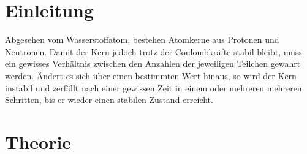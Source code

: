 
	\section{Einleitung}				%
Abgesehen vom Wasserstoffatom, bestehen Atomkerne aus Protonen und Neutronen. Damit der Kern jedoch trotz der Coulombkräfte stabil bleibt, muss ein gewisses Verhältnis zwischen den Anzahlen der jeweiligen Teilchen gewahrt werden. Ändert es sich über einen bestimmten Wert hinaus, so wird der Kern instabil und zerfällt nach einer gewissen Zeit in einem oder mehreren mehreren Schritten, bis er wieder einen stabilen Zustand erreicht.
	\section{Theorie}
